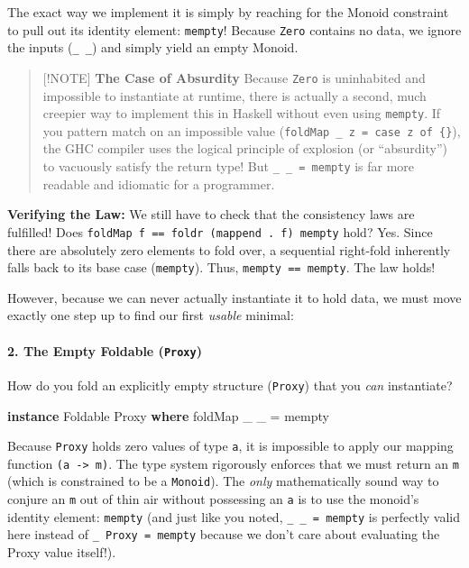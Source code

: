 \documentclass[
]{article}
\newenvironment{Shaded}{}{}
\newcommand{\DataTypeTok}[1]{\textcolor[rgb]{0.56,0.13,0.00}{#1}}
\newcommand{\FunctionTok}[1]{\textcolor[rgb]{0.02,0.16,0.49}{#1}}
\newcommand{\KeywordTok}[1]{\textcolor[rgb]{0.00,0.44,0.13}{\textbf{#1}}}
\newcommand{\NormalTok}[1]{#1}
\newcommand{\OtherTok}[1]{\textcolor[rgb]{0.00,0.44,0.13}{#1}}
\begin{document}
The exact way we implement it is simply by reaching for the Monoid
constraint to pull out its identity element: \texttt{mempty}! Because
\texttt{Zero} contains no data, we ignore the inputs (\texttt{\_\ \_})
and simply yield an empty Monoid.

\begin{quote}
{[}!NOTE{]} \textbf{The Case of Absurdity} Because \texttt{Zero} is
uninhabited and impossible to instantiate at runtime, there is actually
a second, much creepier way to implement this in Haskell without even
using \texttt{mempty}. If you pattern match on an impossible value
(\texttt{foldMap\ \_\ z\ =\ case\ z\ of\ \{\}}), the GHC compiler uses
the logical principle of explosion (or ``absurdity'') to vacuously
satisfy the return type! But \texttt{\_\ \_\ =\ mempty} is far more
readable and idiomatic for a programmer.
\end{quote}

\textbf{Verifying the Law:} We still have to check that the consistency
laws are fulfilled! Does
\texttt{foldMap\ f\ ==\ foldr\ (mappend\ .\ f)\ mempty} hold? Yes. Since
there are absolutely zero elements to fold over, a sequential right-fold
inherently falls back to its base case (\texttt{mempty}). Thus,
\texttt{mempty\ ==\ mempty}. The law holds!

However, because we can never actually instantiate it to hold data, we
must move exactly one step up to find our first \emph{usable} minimal:

\paragraph{\texorpdfstring{2. The Empty Foldable
(\texttt{Proxy})}{2. The Empty Foldable (Proxy)}}\label{the-empty-foldable-proxy}

How do you fold an explicitly empty structure (\texttt{Proxy}) that you
\emph{can} instantiate?

\begin{Shaded}
\begin{Highlighting}[]
\KeywordTok{instance} \DataTypeTok{Foldable} \DataTypeTok{Proxy} \KeywordTok{where}
    \FunctionTok{foldMap}\NormalTok{ \_ \_ }\OtherTok{=} \FunctionTok{mempty}
\end{Highlighting}
\end{Shaded}

Because \texttt{Proxy} holds zero values of type \texttt{a}, it is
impossible to apply our mapping function
\texttt{(a\ -\textgreater{}\ m)}. The type system rigorously enforces
that we must return an \texttt{m} (which is constrained to be a
\texttt{Monoid}). The \emph{only} mathematically sound way to conjure an
\texttt{m} out of thin air without possessing an \texttt{a} is to use
the monoid's identity element: \texttt{mempty} (and just like you noted,
\texttt{\_\ \_\ =\ mempty} is perfectly valid here instead of
\texttt{\_\ Proxy\ =\ mempty} because we don't care about evaluating the
Proxy value itself!).
\end{document}

